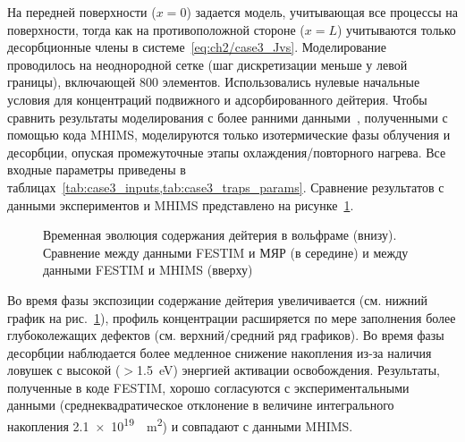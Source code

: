 На передней поверхности ($x=0$) задается модель, учитывающая все процессы на поверхности, тогда как на противоположной стороне ($x=L$) учитываются только десорбционные члены в системе~\eqref{eq:ch2/case3_Jvs}. Моделирование проводилось на неоднородной сетке (шаг дискретизации меньше у левой границы), включающей 800 элементов. Использовались нулевые начальные условия для концентраций подвижного и адсорбированного дейтерия. Чтобы сравнить результаты моделирования с более ранними данными~\cite{Hodille2017}, полученными с помощью кода MHIMS, моделируются только изотермические фазы облучения и десорбции, опуская промежуточные этапы охлаждения/повторного нагрева. Все входные параметры приведены в таблицах~\cref{tab:case3_inputs,tab:case3_traps_params}. Сравнение результатов с данными экспериментов и MHIMS представлено на рисунке~\cref{fig:ch2/val3}.

\begin{figure}[ht]
    \caption{Временная эволюция содержания дейтерия в вольфраме (внизу). Сравнение между данными FESTIM и МЯР (в середине) и между данными FESTIM и MHIMS (вверху)}\label{fig:ch2/val3}
\end{figure}

Во время фазы экспозиции содержание дейтерия увеличивается (см. нижний график на рис.~\ref{fig:ch2/val3}), профиль концентрации расширяется по мере заполнения более глубоколежащих дефектов (см. верхний/средний ряд графиков). Во время фазы десорбции наблюдается более медленное снижение накопления из-за наличия ловушек с высокой ($>$\SI{1.5}{\electronvolt}) энергией активации освобождения. Результаты, полученные в коде FESTIM, хорошо согласуются с экспериментальными данными (среднеквадратическое отклонение в величине интегрального накопления \SI{2.1e19}{\per\meter\squared}) и совпадают с данными MHIMS.

